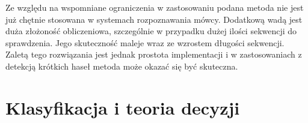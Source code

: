 Ze względu na wspomniane ograniczenia w zastosowaniu podana metoda nie jest już chętnie stosowana w systemach rozpoznawania mówcy. Dodatkową wadą jest duża złożoność obliczeniowa, szczególnie w przypadku dużej ilości sekwencji do sprawdzenia. Jego skuteczność maleje wraz ze wzrostem długości sekwencji. Zaletą tego rozwiązania jest jednak prostota implementacji i w zastosowaniach z detekcją krótkich haseł metoda może okazać się być skuteczna.



\section{Klasyfikacja i teoria decyzji}

